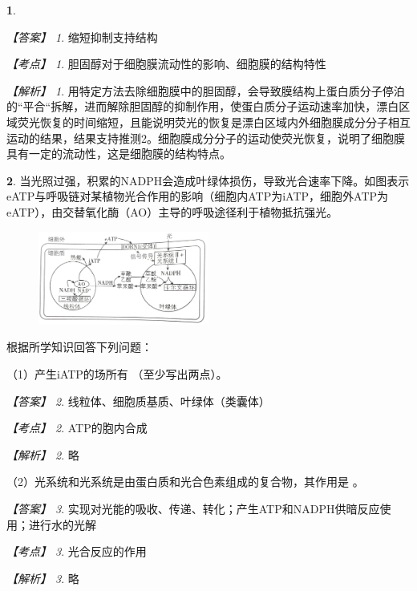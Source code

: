\documentclass[UTF8, 10pt, a4paper, oneside]{ctexart}
\newcommand{\blank}{ \underbar{\quad$\blacktriangle$\quad} }%
\newcommand{\fs}[1]{{\fangsong #1}}%
\newcommand{\circled}[1]{{\small{\textcircled{\tiny{#1}}}}}%
\newcommand{\Romannumeral}[1]{\uppercase\expandafter{\romannumeral#1}}%
\theoremstyle{definition}
\newtheorem{exercise}{}
\theoremstyle{remark}
\newtheorem*{answer}{【答案】}
\newtheorem*{point}{【考点】}      %
\newtheorem*{explanation}{【解析】}     %
\theoremstyle{plain}
\begin{document}
\begin{exercise}
    \begin{answer}
        缩短\qquad 抑制\qquad 支持\qquad 结构
    \end{answer}
    \begin{point}
        胆固醇对于细胞膜流动性的影响、细胞膜的结构特性
    \end{point}
    \begin{explanation}
        用特定方法去除细胞膜中的胆固醇，会导致膜结构上蛋白质分子停泊的“平合“拆解，进而解除胆固醇的抑制作用，使蛋白质分子运动速率加快，漂白区域荧光恢复的时间缩短，且能说明荧光的恢复是漂白区域内外细胞膜成分分子相互运动的结果，结果支持推测\circled{2}。细胞膜成分分子的运动使荧光恢复，说明了细胞膜具有一定的流动性，这是细胞膜的结构特点。
    \end{explanation}
\end{exercise}
\begin{exercise}

    当光照过强，积累的NADPH会造成叶绿体损伤，导致光合速率下降。如图表示eATP与呼吸链对某植物光合作用的影响（细胞内ATP为iATP，细胞外ATP为eATP），由交替氧化酶（AO）主导的呼吸途径利于植物抵抗强光。

    \begin{figure}[h!]
        \centering
        \includegraphics[width=0.5\textwidth]{assists/19-1.jpg}
    \end{figure}
    \noindent 根据所学知识回答下列问题：

    （1）产生iATP的场所有\blank（至少写出两点）。

    \begin{answer}
        线粒体、细胞质基质、叶绿体（类囊体）
    \end{answer}
    \begin{point}
        ATP的胞内合成
    \end{point}
    \begin{explanation}
        \fs{略}
    \end{explanation}


    （2）光系统\Romannumeral{1}和光系统\Romannumeral{2}是由蛋白质和光合色素组成的复合物，其作用是\blank。

    \begin{answer}
        实现对光能的吸收、传递、转化；产生ATP和NADPH供暗反应使用；进行水的光解
    \end{answer}
    \begin{point}
        光合反应的作用
    \end{point}
    \begin{explanation}
        \fs{略}
    \end{explanation}


\end{exercise}
\end{document}
